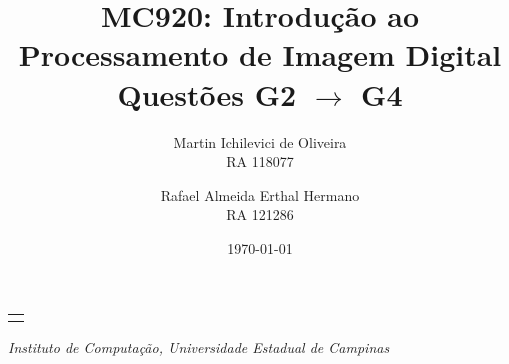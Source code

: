 \documentclass[10pt,a4paper]{article}
\makeatletter
\let\@institution\empty
\def\institution#1{\def\@institution{#1}}
\renewcommand{\maketitle}{
    \begin{center}
        {\Large\bfseries\@title\par\medskip}
        {\large
            \begin{tabular}[t]{c}%
                \@author
        \end{tabular}\par\medskip}
        {\itshape\@institution\par}
        {\itshape\@date\par}
\end{center}}
\makeatother
\begin{document}

\title{MC920: Introdução ao Processamento de Imagem Digital\\Questões G2 $\rightarrow$ G4}
\author{
    \begin{minipage}{6cm}
        \centering
        Martin Ichilevici de Oliveira\\
        RA 118077
    \end{minipage}
    \and
    \begin{minipage}{6cm}
        \centering
        Rafael Almeida Erthal Hermano\\
        RA 121286
    \end{minipage}
}
\institution{Instituto de Computação, Universidade Estadual de Campinas}
\date{\today}

\newcommand{\itemm}[1]{\item \textbf{#1}}

\maketitle

\end{document}
